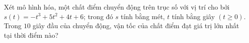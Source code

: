 \begin{ex}
Xét mô hình hóa, một chất điểm chuyển động trên trục số với vị trí cho bởi $s(t)=-t^3+5t^2+4t+6$; trong đó $s$ tính bằng mét, $t$ tính bằng giây $(t\ge0)$. Trong $10$ giây đầu của chuyển động, vận tốc của chất điểm đạt giá trị lớn nhất tại thời điểm nào?
\end{ex}
